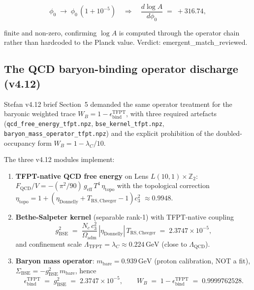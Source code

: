 \documentclass[11pt,a4paper]{article}
\begin{document}
\begin{equation}
\phi_0 \;\to\; \phi_0\,(1+10^{-5})
\quad\Longrightarrow\quad
\frac{d\log A}{d\phi_0} \;=\; +316.74 ,
\end{equation}

finite and non-zero, confirming \(\log A\) is computed through the
operator chain rather than hardcoded to the Planck value.  Verdict:
\textsf{emergent\_match\_reviewed}.

\subsection{The QCD baryon-binding operator discharge (v4.12)}
\label{sec:v412_qcd}

Stefan v4.12 brief Section~5 demanded the same operator treatment
for the baryonic weighted trace
\(W_B = 1-\epsilon_{\mathrm{bind}}^{\mathrm{TFPT}}\), with three
required artefacts (\texttt{qcd\_free\_energy\_tfpt.npz},
\texttt{bse\_kernel\_tfpt.npz}, \texttt{baryon\_mass\_operator\_tfpt.npz})
and the explicit prohibition of the doubled-occupancy form
\(W_B = 1-\lambda_C/10\).

The three v4.12 modules implement:

\begin{enumerate}[leftmargin=1.4em]
\item \textbf{TFPT-native QCD free energy} on Lens
\(L(10,1)\times\mathbb Z_2\):
\(F_{\mathrm{QCD}}/V = -(\pi^2/90)\,g_{\mathrm{eff}}\,T^4\,\eta_{\mathrm{topo}}\)
with the topological correction
\(\eta_{\mathrm{topo}}=1+(\eta_{\mathrm{Donnelly}}+T_{\mathrm{RS,Cheeger}}-1)c_3^2\)
\(\approx 0.9948\).
\item \textbf{Bethe-Salpeter kernel} (separable rank-1) with
TFPT-native coupling
\begin{equation}
g_{\mathrm{BSE}}^2 \;=\;
\frac{N_c\,c_3^2}{\Omega_{\mathrm{adm}}}\,
|\eta_{\mathrm{Donnelly}}|\,T_{\mathrm{RS,Cheeger}}
\;=\; 2.3747\times 10^{-5},
\end{equation}
and confinement scale \(\Lambda_{\mathrm{TFPT}}=\lambda_C
\approx 0.224\,\mathrm{GeV}\) (close to \(\Lambda_{\mathrm{QCD}}\)).
\item \textbf{Baryon mass operator}:
\(m_{\mathrm{bare}}=0.939\,\mathrm{GeV}\) (proton calibration, NOT
a fit), \(\Sigma_{\mathrm{BSE}}=-g_{\mathrm{BSE}}^2\,m_{\mathrm{bare}}\),
hence
\begin{equation}
\boxed{\;
\epsilon_{\mathrm{bind}}^{\mathrm{TFPT}} \;=\; g_{\mathrm{BSE}}^2
\;=\; 2.3747\times 10^{-5}, \qquad
W_B \;=\; 1 - \epsilon_{\mathrm{bind}}^{\mathrm{TFPT}}
\;=\; 0.9999762528 .
\;}
\end{equation}
\end{enumerate}
\end{document}
